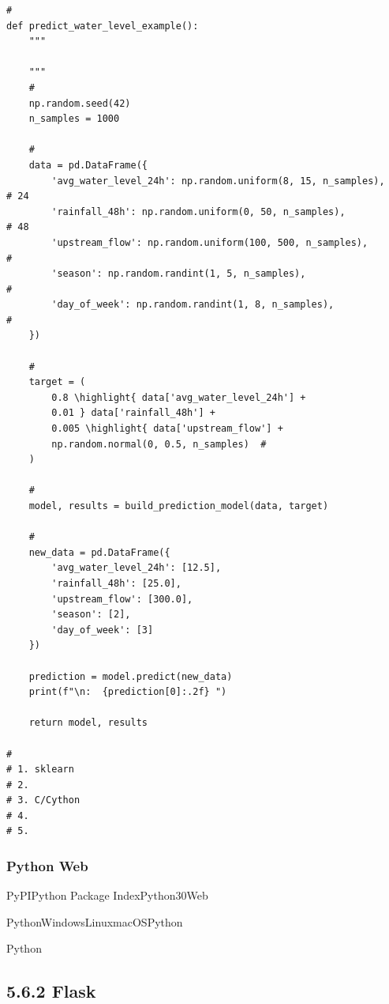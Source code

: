 \begin{lstlisting}[style=python]
# 
def predict_water_level_example():
    """
    
    """
    # 
    np.random.seed(42)
    n_samples = 1000
    
    # 
    data = pd.DataFrame({
        'avg_water_level_24h': np.random.uniform(8, 15, n_samples),    # 24
        'rainfall_48h': np.random.uniform(0, 50, n_samples),           # 48
        'upstream_flow': np.random.uniform(100, 500, n_samples),       # 
        'season': np.random.randint(1, 5, n_samples),                  # 
        'day_of_week': np.random.randint(1, 8, n_samples),            # 
    })
    
    # 
    target = (
        0.8 \highlight{ data['avg_water_level_24h'] + 
        0.01 } data['rainfall_48h'] +
        0.005 \highlight{ data['upstream_flow'] +
        np.random.normal(0, 0.5, n_samples)  # 
    )
    
    # 
    model, results = build_prediction_model(data, target)
    
    # 
    new_data = pd.DataFrame({
        'avg_water_level_24h': [12.5],
        'rainfall_48h': [25.0],
        'upstream_flow': [300.0],
        'season': [2],
        'day_of_week': [3]
    })
    
    prediction = model.predict(new_data)
    print(f"\n:  {prediction[0]:.2f} ")
    
    return model, results

# 
# 1. sklearn
# 2. 
# 3. C/Cython
# 4. 
# 5. 
\end{lstlisting}

\hypertarget{python-web-1}{%
\subsubsection{Python Web}\label{python-web-1}}

\important{}PyPIPython Package IndexPython30Web

\important{}PythonWindowsLinuxmacOSPython

\important{}Python

\hypertarget{flask}{%
\subsection{5.6.2 Flask}\label{flask}}

\hypertarget{section-83}{%
\subsubsection{}\label{section-83}}

